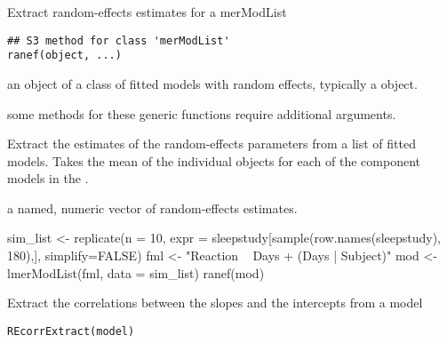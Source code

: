 \documentclass[letterpaper]{book}
\begin{document}
%
\begin{Description}\relax
Extract random-effects estimates for a merModList
\end{Description}
%
\begin{Usage}
\begin{verbatim}
## S3 method for class 'merModList'
ranef(object, ...)
\end{verbatim}
\end{Usage}
%
\begin{Arguments}
\begin{ldescription}
\item[\code{object}] an object of a class of fitted models with
random effects, typically a
 object.

\item[\code{...}] some methods for these generic functions
require additional arguments.
\end{ldescription}
\end{Arguments}
%
\begin{Details}\relax
Extract the estimates of the random-effects parameters from a list of
fitted  models. Takes the mean of the individual 
objects for each of the component models in the .
\end{Details}
%
\begin{Value}
a named, numeric vector of random-effects estimates.
\end{Value}
%
\begin{Examples}
\begin{ExampleCode}
sim_list <- replicate(n = 10,
        expr = sleepstudy[sample(row.names(sleepstudy), 180),],
        simplify=FALSE)
fml <- "Reaction ~ Days + (Days | Subject)"
mod <- lmerModList(fml, data = sim_list)
ranef(mod)
\end{ExampleCode}
\end{Examples}
%
\begin{Description}\relax
Extract the correlations between the slopes and the intercepts from a model
\end{Description}
%
\begin{Usage}
\begin{verbatim}
REcorrExtract(model)
\end{verbatim}
\end{Usage}
\end{document}
